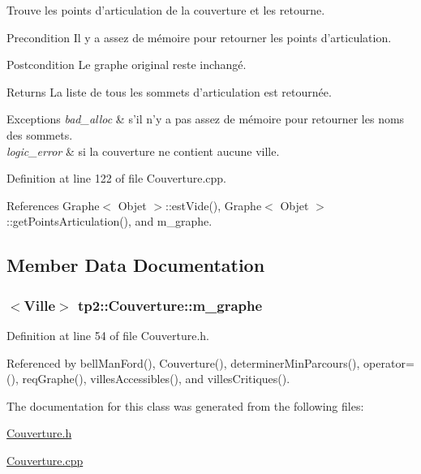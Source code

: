 Trouve les points d'articulation de la couverture et les retourne. 

\begin{DoxyPrecond}{Precondition}
Il y a assez de mémoire pour retourner les points d'articulation. 
\end{DoxyPrecond}
\begin{DoxyPostcond}{Postcondition}
Le graphe original reste inchangé. 
\end{DoxyPostcond}
\begin{DoxyReturn}{Returns}
La liste de tous les sommets d'articulation est retournée. 
\end{DoxyReturn}

\begin{DoxyExceptions}{Exceptions}
{\em bad\_\-alloc} & s'il n'y a pas assez de mémoire pour retourner les noms des sommets. \\
\hline
{\em logic\_\-error} & si la couverture ne contient aucune ville. \\
\hline
\end{DoxyExceptions}


Definition at line 122 of file Couverture.cpp.



References Graphe$<$ Objet $>$::estVide(), Graphe$<$ Objet $>$::getPointsArticulation(), and m\_\-graphe.



\subsection{Member Data Documentation}
\hypertarget{classtp2_1_1_couverture_a6a620a08b2a810862999c0059c87408e}{
\subsubsection[{m\_\-graphe}]{$<${\bf Ville}$>$ {\bf tp2::Couverture::m\_\-graphe}}}
\label{classtp2_1_1_couverture_a6a620a08b2a810862999c0059c87408e}


Definition at line 54 of file Couverture.h.



Referenced by bellManFord(), Couverture(), determinerMinParcours(), operator=(), reqGraphe(), villesAccessibles(), and villesCritiques().



The documentation for this class was generated from the following files:\begin{DoxyCompactItemize}
\item 
\hyperlink{_couverture_8h}{Couverture.h}\item 
\hyperlink{_couverture_8cpp}{Couverture.cpp}\end{DoxyCompactItemize}
